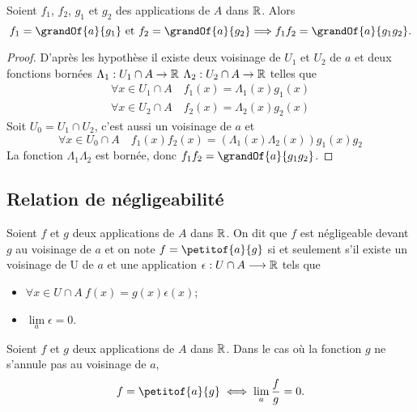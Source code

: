 \begin{prop}
  Soient $f_1$, $f_2$, $g_1$ et $g_2$ des applications de $A$ dans $\mathbb{R}$. Alors
  \begin{equation}
    f_1=\grandOf{a}{g_1} \text{~et~} f_2=\grandOf{a}{g_2} \Longrightarrow f_1f_2 = \grandOf{a}{g_1g_2}.
  \end{equation}
\end{prop}
\begin{proof}
  D'après les hypothèse il existe deux voisinage de $U_1$ et $U_2$ de $a$ et deux fonctions bornées $\Lambda_1:U_1 \cap A \rightarrow \mathbb{R}$ $\Lambda_2:U_2 \cap A \rightarrow \mathbb{R}$ telles que
  \begin{align}
    \forall x \in U_1\cap A \quad f_1(x)=\Lambda_1(x)g_1(x)\\
    \forall x \in U_2\cap A \quad f_2(x)=\Lambda_2(x)g_2(x)
  \end{align}
  Soit $U_0=U_1 \cap U_2$, c'est aussi un voisinage de $a$ et
  \begin{equation}
    \forall x \in U_0 \cap A \quad f_1(x)f_2(x) = (\Lambda_1(x) \Lambda_2(x)) g_1(x)g_2
  \end{equation}
  La fonction $\Lambda_1 \Lambda_2$ est bornée, donc $f_1f_2 = \grandOf{a}{g_1g_2}$.
\end{proof}

\subsection{Relation de négligeabilité}

\begin{defdef}
  Soient $f$ et $g$ deux applications de $A$ dans $\mathbb{R}$. On dit que $f$ est négligeable devant $g$ au voisinage de $a$ et on note $f=\petitof{a}{g}$ si et seulement s'il existe un voisinage de U de $a$ et une application $\epsilon : U\cap A \longrightarrow \mathbb{R}$ tels que
  \begin{itemize}
  \item $\forall x \in U \cap A \ f(x)=g(x)\epsilon(x)$;
  \item $\lim\limits_{a} \epsilon =0$.
  \end{itemize}
\end{defdef}
\begin{prop}
  Soient $f$ et $g$ deux applications de $A$ dans $\mathbb{R}$. Dans le cas où la fonction $g$ ne s'annule pas au voisinage de $a$,
  \begin{equation}
    f=\petitof{a}{g} \iff \lim\limits_{a} \frac{f}{g}=0.
  \end{equation}
\end{prop}

